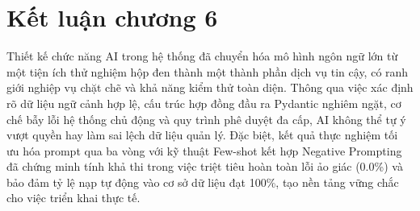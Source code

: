 \section{Kết luận chương 6}

Thiết kế chức năng AI trong hệ thống đã chuyển hóa mô hình ngôn ngữ lớn từ một tiện ích thử nghiệm hộp đen thành một thành phần dịch vụ tin cậy, có ranh giới nghiệp vụ chặt chẽ và khả năng kiểm thử toàn diện. Thông qua việc xác định rõ dữ liệu ngữ cảnh hợp lệ, cấu trúc hợp đồng đầu ra Pydantic nghiêm ngặt, cơ chế bẫy lỗi hệ thống chủ động và quy trình phê duyệt đa cấp, AI không thể tự ý vượt quyền hay làm sai lệch dữ liệu quản lý. Đặc biệt, kết quả thực nghiệm tối ưu hóa prompt qua ba vòng với kỹ thuật Few-shot kết hợp Negative Prompting đã chứng minh tính khả thi trong việc triệt tiêu hoàn toàn lỗi ảo giác (0.0\%) và bảo đảm tỷ lệ nạp tự động vào cơ sở dữ liệu đạt 100\%, tạo nền tảng vững chắc cho việc triển khai thực tế.


